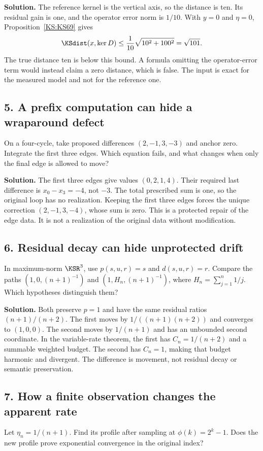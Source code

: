 \documentclass[11pt,oneside,openany]{book}
\numberwithin{equation}{section}
\begin{document}
\textbf{Solution.} The reference kernel is the vertical axis, so the distance is ten. Its residual gain is one, and the operator error norm is \(1/10\). With \(y=0\) and \(\eta=0\), Proposition~\ref{KS:KS69} gives
\[
 \KSdist(x,\ker D)\le\frac1{10}\sqrt{10^2+100^2}=\sqrt{101}.
\]
The true distance ten is below this bound. A formula omitting the operator-error term would instead claim a zero distance, which is false. The input is exact for the measured model and not for the reference one.

\subsection*{5. A prefix computation can hide a wraparound defect}
On a four-cycle, take proposed differences \((2,-1,3,-3)\) and anchor zero. Integrate the first three edges. Which equation fails, and what changes when only the final edge is allowed to move?

\textbf{Solution.} The first three edges give values \((0,2,1,4)\). Their required last difference is \(x_0-x_3=-4\), not \(-3\). The total prescribed sum is one, so the original loop has no realization. Keeping the first three edges forces the unique correction \((2,-1,3,-4)\), whose sum is zero. This is a protected repair of the edge data. It is not a realization of the original data without modification.

\subsection*{6. Residual decay can hide unprotected drift}
In maximum-norm $\KSR^3$, use $p(s,u,r)=s$ and $d(s,u,r)=r$. Compare the paths $(1,0,(n+1)^{-1})$ and $(1,H_n,(n+1)^{-1})$, where $H_n=\sum_{j=1}^{n}1/j$. Which hypotheses distinguish them?

\textbf{Solution.} Both preserve $p=1$ and have the same residual ratios $(n+1)/(n+2)$. The first moves by $1/((n+1)(n+2))$ and converges to $(1,0,0)$. The second moves by $1/(n+1)$ and has an unbounded second coordinate. In the variable-rate theorem, the first has $C_n=1/(n+2)$ and a summable weighted budget. The second has $C_n=1$, making that budget harmonic and divergent. The difference is movement, not residual decay or semantic preservation.

\subsection*{7. How a finite observation changes the apparent rate}
Let $\eta_n=1/(n+1)$. Find its profile after sampling at $\phi(k)=2^k-1$. Does the new profile prove exponential convergence in the original index?
\end{document}
